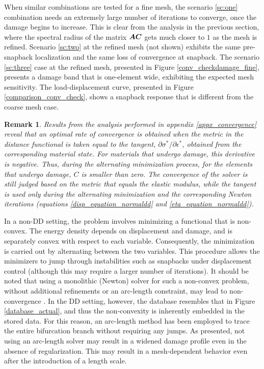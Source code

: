 \documentclass[10pt,review]{cas-sc}
\newtheorem*{remark}{Remark}
\begin{document}
When similar combinations are tested for a fine mesh, the scenario \ref{sc:one} combination needs an extremely large number of iterations to converge, once the damage begins to increase. This is clear from the analysis in the previous section, where the spectral radius of the matrix $\mbox{\boldmath $A$} \mbox{\boldmath $C$} $ gets much closer to $1$ as the mesh is refined. Scenario \ref{sc:two} at the refined mesh (not shown) exhibits the same pre-snapback localization and the same loss of convergence at snapback. The scenario \ref{sc:three} case at the refined mesh, presented in Figure \ref{conv_checkdamage_fine}, presents a damage band that is one-element wide, exhibiting the expected mesh sensitivity. The load-displacement curve, presented in Figure \ref{comparison_conv_check}, shows a snapback response that is different from the coarse mesh case.


\begin{remark}
	Results from the analysis performed in appendix \ref{appx_convergence} reveal that an optimal rate of convergence is obtained when the metric in the distance functional is taken equal to the tangent, ${\partial \sigma^*}/{\partial \epsilon^*}$, obtained from the corresponding material state. For materials that undergo damage, this derivative is negative. Thus, during the alternating minimization process, for the elements that undergo damage, $C$ is smaller than zero. The convergence of the solver is still judged based on the metric that equals the elastic modulus, while the tangent is used only during the alternating minimization and the corresponding Newton iterations (equations \ref{disp_equation_normaldd} and \ref{eta_equation_normaldd}).
\end{remark}


In a non-DD setting, the problem involves minimizing a functional that is non-convex. The energy density depends on displacement and damage, and is separately convex with respect to each variable. Consequently, the minimization is carried out by alternating between the two variables. This procedure allows the minimizers to jump through instabilities such as snapbacks under displacement control (although this may require a larger number of iterations). It should be noted that using a monolithic (Newton) solver for such a non-convex problem, without additional refinements or an arc-length constraint, may lead to non-convergence \cite{Farrell2017, Gerasimov2016, Singh2016, Bharali2022}. In the DD setting, however, the database resembles that in Figure \ref{database_actual}, and thus the non-convexity is inherently embedded in the stored data. For this reason, an arc-length method has been employed to trace the entire bifurcation branch without requiring any jumps. As presented, not using an arc-length solver may result in a widened damage profile even in the absence of regularization. This may result in a mesh-dependent behavior even after the introduction of a length scale.
\end{document}
